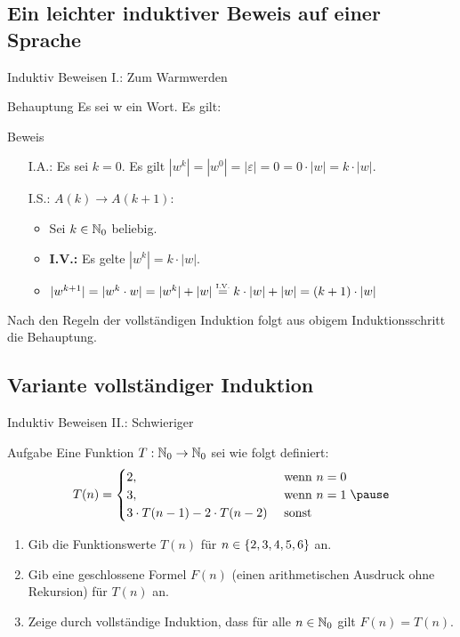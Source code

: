 \subsection{Ein leichter induktiver Beweis auf einer Sprache}
\begin{frame}{Induktiv Beweisen I.: Zum Warmwerden}
	\begin{exampleblock}{Behauptung}
		Es sei w ein Wort. Es gilt:\\[.5em]
	\end{exampleblock}
\pause
	\begin{block}{Beweis}
		\begin{itemize}
			\item[I.A.:] Es sei $k=0$. Es gilt $|w^k|=|w^0|=|\varepsilon|=0=0 \cdot |w| = k \cdot |w|$.
			\item[I.S.:] $A(k) \rightarrow A(k+1)$:
				\begin{itemize}
					\item Sei $k \in \mathbb{N}_{0}$ beliebig.
					\item \textbf{I.V.:} Es gelte $|w^k|=k \cdot |w|$. \\[1em]
					\item $|w^{k+1}|=|w^k \cdot w|=|w^k|+|w| \eqtext{I.V.} k \cdot |w| + |w| = (k+1) \cdot |w|$
				\end{itemize}						
		\end{itemize}

		Nach den Regeln der vollständigen Induktion folgt aus obigem Induktionsschritt die Behauptung.
	\end{block}
\end{frame}
\subsection{Variante vollständiger Induktion} %
\begin{frame}{Induktiv Beweisen II.: Schwieriger}
	\begin{exampleblock}{Aufgabe}
		Eine Funktion $T:\mathbb{N}_0 \rightarrow \mathbb{N}_0$ sei wie folgt definiert:
		\begin{equation*}
		T(n) = 
			\begin{cases}
			 2, &\text{ wenn } n=0 \\
			 3, &\text{ wenn } n=1 \\
			 3 \cdot T(n-1) - 2 \cdot T(n-2) &\text{ sonst}
		\end{cases} \pause
		\end{equation*}
		\begin{enumerate}
			\item Gib die Funktionswerte $T(n)$ für $n \in \left\{ 2,3,4,5,6 \right\}$ an.
			\item Gib eine geschlossene Formel $F(n)$ (einen arithmetischen Ausdruck ohne Rekursion) für $T(n)$ an.
			\item Zeige durch vollständige Induktion, dass für alle $n \in \mathbb{N}_0$ gilt $F(n) = T(n)$.
		\end{enumerate}
	\end{exampleblock}
\end{frame}

